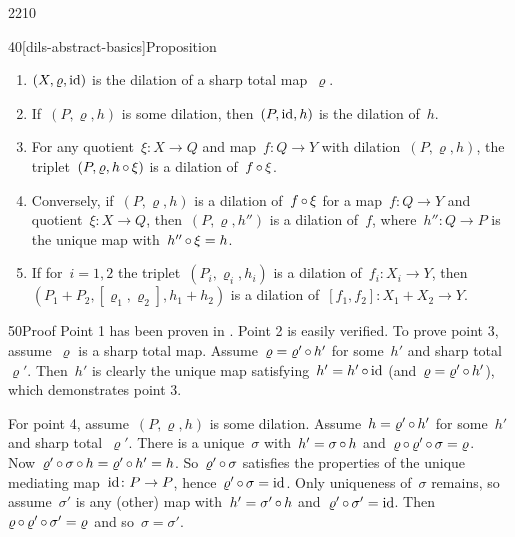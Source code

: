\begin{parsec}{2210}
\begin{point}{40}[dils-abstract-basics]{Proposition}
\begin{enumerate}
\item
    $(X, \varrho, \operatorname{id})$ is the dilation
        of a sharp total map~$\varrho$.

\item
    If~$(P, \varrho, h)$ is some dilation,
        then~$(P, \operatorname{id}, h)$ is the dilation of~$h$.

\item
    For any quotient~$\xi \colon X \to Q$
            and map~$f\colon Q \to Y$
            with dilation~$(P, \varrho, h)$,
            the triplet~$(P, \varrho, h \mathop{\circ} \xi)$
            is a dilation of~$f \mathop{\circ} \xi$.

\item
    Conversely, if~$(P, \varrho, h)$
            is a dilation of~$f \mathop{\circ} \xi$
            for a map~$f\colon Q \to Y$
            and quotient~$\xi \colon X \to Q$,
        then~$(P, \varrho, h'')$ is a dilation of~$f$,
        where~$h''\colon Q \to P$ is the unique map with~$h'' \mathop{\circ} \xi = h$.

\item
    If for~$i=1,2$ the triplet~$(P_i, \varrho_i, h_i)$
            is a dilation of~$f_i \colon X_i \to Y$,
    then~$(P_1 + P_2, [\varrho_1,\varrho_2], h_1 + h_2)$
        is a dilation of~$[f_1, f_2] \colon X_1 + X_2 \to Y$.
\end{enumerate}
\begin{point}{50}{Proof}%
Point 1 has been proven in .
Point 2 is easily verified.
To prove point 3, assume~$\varrho$ is a sharp total map.
Assume~$\varrho = \varrho' \mathop{\circ} h'$ for some~$h'$ and sharp total~$\varrho'$.
Then~$h'$ is clearly the unique map
    satisfying~$h' = h' \mathop{\circ} \operatorname{id}$ (and~$\varrho = \varrho' \mathop{\circ} h'$),
    which demonstrates point 3.

For point 4, assume~$(P, \varrho, h)$ is some dilation.
Assume~$h = \varrho' \mathop{\circ} h'$ for some~$h'$ and sharp total~$\varrho'$.
There is a unique~$\sigma$ with~$h' = \sigma \mathop{\circ} h$
    and~$\varrho\mathop{\circ} \varrho' \mathop{\circ} \sigma = \varrho$.
Now~$\varrho' \mathop{\circ} \sigma \mathop{\circ} h = \varrho' \mathop{\circ} h' = h$.
    So~$\varrho' \mathop{\circ} \sigma$
        satisfies the properties of the unique mediating map~$\operatorname{id}\colon P \to P$,
        hence~$\varrho' \mathop{\circ} \sigma = \operatorname{id}$.
Only uniqueness of~$\sigma$ remains,
    so assume~$\sigma'$ is any (other) map with~$h'  = \sigma' \mathop{\circ} h$
    and~$\varrho' \mathop{\circ} \sigma' = \operatorname{id}$.
Then~$\varrho \mathop{\circ} \varrho' \mathop{\circ} \sigma' = \varrho$
    and so~$\sigma = \sigma'$.


\end{point}
\end{point}
\end{parsec}
